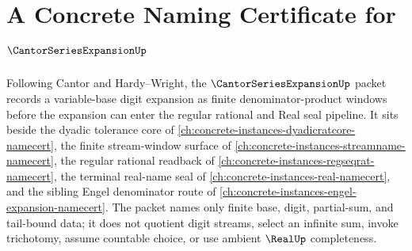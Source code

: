 \chapter{A Concrete Naming Certificate for $\CantorSeriesExpansionUp$}
\label{ch:concrete-instances-cantor-series-expansion-namecert}

Following Cantor and Hardy--Wright, the $\CantorSeriesExpansionUp$ packet records a variable-base digit expansion as finite denominator-product windows before the expansion can enter the regular rational and Real seal pipeline. It sits beside the dyadic tolerance core of \autoref{ch:concrete-instances-dyadicratcore-namecert}, the finite stream-window surface of \autoref{ch:concrete-instances-streamname-namecert}, the regular rational readback of \autoref{ch:concrete-instances-regseqrat-namecert}, the terminal real-name seal of \autoref{ch:concrete-instances-real-namecert}, and the sibling Engel denominator route of \autoref{ch:concrete-instances-engel-expansion-namecert}. The packet names only finite base, digit, partial-sum, and tail-bound data; it does not quotient digit streams, select an infinite sum, invoke trichotomy, assume countable choice, or use ambient $\RealUp$ completeness.


